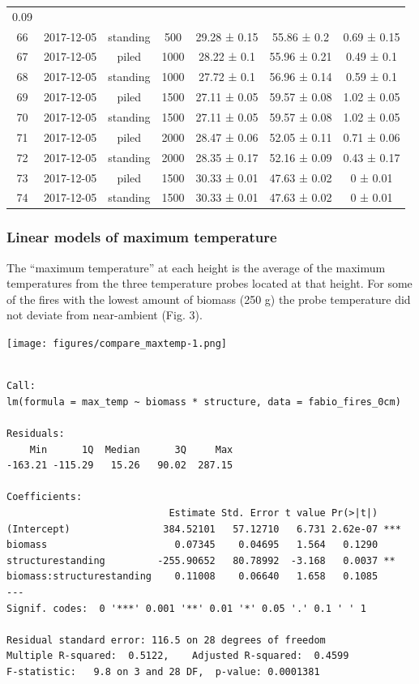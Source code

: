 \documentclass[11pt,a4paper]{article}
\begin{document}
\begin{longtable}[]{@{}ccccccc@{}}
0.09\tabularnewline
66 & 2017-12-05 & standing & 500 & 29.28 ± 0.15 & 55.86 ± 0.2 & 0.69 ±
0.15\tabularnewline
67 & 2017-12-05 & piled & 1000 & 28.22 ± 0.1 & 55.96 ± 0.21 & 0.49 ±
0.1\tabularnewline
68 & 2017-12-05 & standing & 1000 & 27.72 ± 0.1 & 56.96 ± 0.14 & 0.59 ±
0.1\tabularnewline
69 & 2017-12-05 & piled & 1500 & 27.11 ± 0.05 & 59.57 ± 0.08 & 1.02 ±
0.05\tabularnewline
70 & 2017-12-05 & standing & 1500 & 27.11 ± 0.05 & 59.57 ± 0.08 & 1.02 ±
0.05\tabularnewline
71 & 2017-12-05 & piled & 2000 & 28.47 ± 0.06 & 52.05 ± 0.11 & 0.71 ±
0.06\tabularnewline
72 & 2017-12-05 & standing & 2000 & 28.35 ± 0.17 & 52.16 ± 0.09 & 0.43 ±
0.17\tabularnewline
73 & 2017-12-05 & piled & 1500 & 30.33 ± 0.01 & 47.63 ± 0.02 & 0 ±
0.01\tabularnewline
74 & 2017-12-05 & standing & 1500 & 30.33 ± 0.01 & 47.63 ± 0.02 & 0 ±
0.01\tabularnewline
\bottomrule
\end{longtable}

\hypertarget{linear-models-of-maximum-temperature}{%
\subsubsection{Linear models of maximum
temperature}\label{linear-models-of-maximum-temperature}}

The ``maximum temperature'' at each height is the average of the maximum
temperatures from the three temperature probes located at that height.
For some of the fires with the lowest amount of biomass (250 g) the
probe temperature did not deviate from near-ambient (Fig. 3).

\texttt{[image: figures/compare\_maxtemp-1.png]}

\begin{verbatim}

Call:
lm(formula = max_temp ~ biomass * structure, data = fabio_fires_0cm)

Residuals:
    Min      1Q  Median      3Q     Max 
-163.21 -115.29   15.26   90.02  287.15 

Coefficients:
                            Estimate Std. Error t value Pr(>|t|)    
(Intercept)                384.52101   57.12710   6.731 2.62e-07 ***
biomass                      0.07345    0.04695   1.564   0.1290    
structurestanding         -255.90652   80.78992  -3.168   0.0037 ** 
biomass:structurestanding    0.11008    0.06640   1.658   0.1085    
---
Signif. codes:  0 '***' 0.001 '**' 0.01 '*' 0.05 '.' 0.1 ' ' 1

Residual standard error: 116.5 on 28 degrees of freedom
Multiple R-squared:  0.5122,    Adjusted R-squared:  0.4599 
F-statistic:   9.8 on 3 and 28 DF,  p-value: 0.0001381
\end{verbatim}
\end{document}
